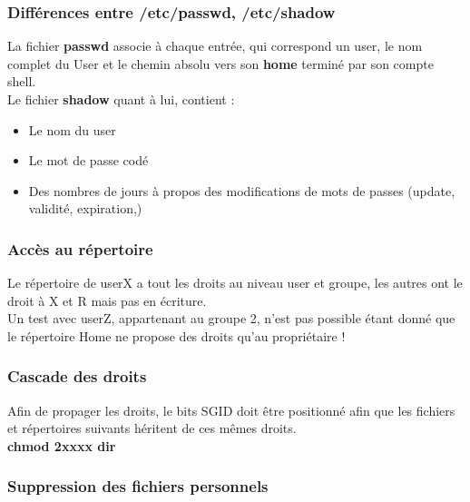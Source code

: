 \documentclass[a4paper,10pt,final,fleqn]{article}
\begin{document}
			\subsubsection{Différences entre /etc/passwd, /etc/shadow}

				La fichier \textbf{passwd} associe à chaque entrée, qui correspond un user, le nom complet du User et le chemin absolu vers son \textbf{home} terminé par son compte shell.\\

				Le fichier \textbf{shadow} quant à lui, contient : \\

				\begin{itemize}
					\item Le nom du user
					\item Le mot de passe codé
					\item Des nombres de jours à propos des modifications de mots de passes (update, validité, expiration,)
				\end{itemize}

			\subsubsection{Accès au répertoire}
		
				Le répertoire de userX a tout les droits au niveau user et groupe, les autres ont le droit à X et R mais pas en écriture.\\

				Un test avec userZ, appartenant au groupe 2, n'est pas possible étant donné que le répertoire Home ne propose des droits qu'au propriétaire ! \\

			\subsubsection{Cascade des droits}

				Afin de propager les droits, le bits SGID doit être positionné afin que les fichiers et répertoires suivants héritent de ces mêmes droits.\\

				\textbf{chmod 2xxxx dir}\\

			\subsubsection{Suppression des fichiers personnels}
\end{document}
